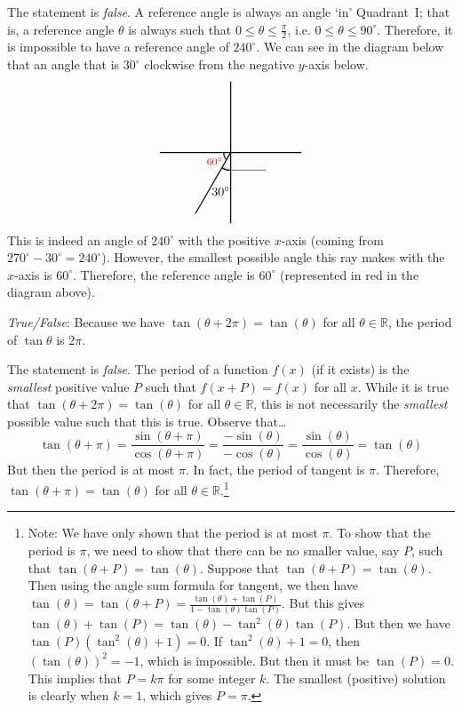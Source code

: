 \documentclass[11pt,letterpaper]{article}
\begin{document}
\sol The statement is \textit{false}. A reference angle is always an angle `in' Quadrant~I; that is, a reference angle $\theta$ is always such that $0 \leq \theta \leq \frac{\pi}{2}$, i.e. $0 \leq \theta \leq 90^\circ$. Therefore, it is impossible to have a reference angle of $240^\circ$. We can see in the diagram below that an angle that is $30^\circ$ clockwise from the negative $y$-axis below.
	\[
	\begin{tikzpicture}
	\draw[line width=0.03cm] (-2,0) -- (2,0);
	\draw[line width=0.03cm] (0,-2) -- (0,2);
	\draw[line width=0.03cm] (0,0) -- (-1, -1.73205);
	\draw[line width=0.03cm] (0,-0.5) arc(270:240:0.5);
	\node at (-0.28,-1.1) {$30^\circ$};
	
	\draw (0,-0.5) -- (1,-0.5);
	\draw[line width=0.03cm] (-0.2,0) arc(180:220:0.3);
	\node at (-0.45,-0.25) {\footnotesize\color{red}$60^\circ$};
	\end{tikzpicture}
	\]
This is indeed an angle of $240^\circ$ with the positive $x$-axis (coming from $270^\circ - 30^\circ= 240^\circ$). However, the smallest possible angle this ray makes with the $x$-axis is $60^\circ$. Therefore, the reference angle is $60^\circ$ (represented in red in the diagram above). \pvspace{1.3cm}



\quizsol \textit{True/False}: Because we have $\tan(\theta + 2\pi)= \tan(\theta)$ for all $\theta \in \mathbb{R}$, the period of $\tan \theta$ is $2\pi$. 

\sol The statement is \textit{false}. The period of a function $f(x)$ (if it exists) is the \textit{smallest} positive value $P$ such that $f(x + P)= f(x)$ for all $x$. While it is true that $\tan(\theta + 2\pi)= \tan(\theta)$ for all $\theta \in \mathbb{R}$, this is not necessarily the \textit{smallest} possible value such that this is true. Observe that\dots
	\[
	\tan(\theta + \pi)= \dfrac{\sin(\theta + \pi)}{\cos(\theta + \pi)}= \dfrac{-\sin(\theta)}{-\cos(\theta)}= \dfrac{\sin(\theta)}{\cos(\theta)}= \tan(\theta)
	\]
But then the period is at most $\pi$. In fact, the period of tangent is $\pi$. Therefore, $\tan(\theta + \pi)= \tan(\theta)$ for all $\theta \in \mathbb{R}$.\footnote{Note: We have only shown that the period is at most $\pi$. To show that the period is $\pi$, we need to show that there can be no smaller value, say $P$, such that $\tan(\theta + P)= \tan(\theta)$. Suppose that $\tan(\theta + P)= \tan(\theta)$. Then using the angle sum formula for tangent, we then have $\tan(\theta)= \tan(\theta + P)= \frac{\tan(\theta) + \tan(P)}{1 - \tan(\theta) \tan(P)}$. But this gives $\tan(\theta) + \tan(P)= \tan(\theta) - \tan^2(\theta) \tan(P)$. But then we have $\tan(P) \left( \tan^2(\theta) + 1 \right)= 0$. If $\tan^2(\theta) + 1= 0$, then $\left( \tan(\theta) \right)^2= -1$, which is impossible. But then it must be $\tan(P)= 0$. This implies that $P= k\pi$ for some integer $k$. The smallest (positive) solution is clearly when $k= 1$, which gives $P= \pi$.}
\end{document}
